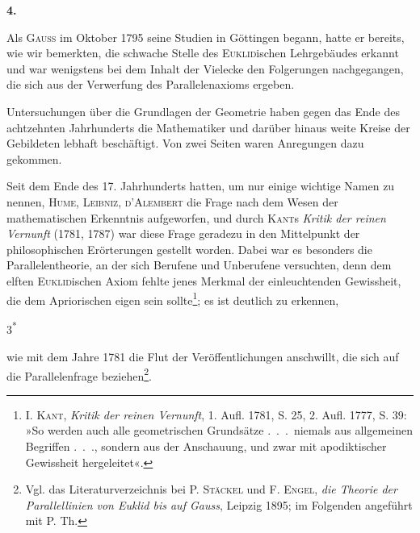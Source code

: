 \clearpage\begingroup{}
\renewcommand{\thefootnote}{\arabic{footnote})}\setcounter{footnote}{0}
\begin{center}\textbf{4.}\par\smallskip
{}
\end{center}
\noindent\hspace*{\parindent}Als \textsc{Gauss} im Oktober 1795 seine Studien in Göttingen begann, hatte
er bereits, wie wir bemerkten, die schwache Stelle des \textsc{Euklid}ischen Lehrgebäudes
erkannt und war wenigstens bei dem Inhalt der Vielecke den Folgerungen
nachgegangen, die sich aus der Verwerfung des Parallelenaxioms ergeben.
\par
Untersuchungen über die Grundlagen der Geometrie haben gegen das
Ende des achtzehnten Jahrhunderts die Mathematiker und darüber hinaus weite
Kreise der Gebildeten lebhaft beschäftigt. Von zwei Seiten waren Anregungen
dazu gekommen.
\par
Seit dem Ende des 17. Jahrhunderts hatten, um nur einige wichtige
Namen zu nennen, \textsc{Hume}, \textsc{Leibniz}, \textsc{d’Alembert} die Frage nach dem Wesen
der mathematischen Erkenntnis aufgeworfen, und durch \textsc{Kant}s \textit{Kritik der
reinen Vernunft} (1781, 1787) war diese Frage geradezu in den Mittelpunkt
der philosophischen Erörterungen gestellt worden. Dabei war es besonders
die Parallelentheorie, an der sich Berufene und Unberufene versuchten, denn
dem elften \textsc{Euklid}ischen Axiom fehlte jenes Merkmal der einleuchtenden Gewissheit,
die dem Apriorischen eigen sein sollte\footnote{I. \textsc{Kant}, \textit{Kritik der reinen Vernunft}, 1. Aufl. 1781, S. 25, 2. Aufl. 1777, S. 39: »So werden auch alle geometrischen Grundsätze .\ .\ .\ niemals aus allgemeinen Begriffen .\ .\ ., sondern aus der Anschauung, und zwar  mit apodiktischer Gewissheit hergeleitet«.}; es ist deutlich zu erkennen,
\par\vfill\hfill{\footnotesize 3\textsuperscript{*}}\par
\clearpage{}\setcounter{footnote}{0}
\noindent wie mit dem Jahre 1781 die Flut der Veröffentlichungen anschwillt, die sich
auf die Parallelenfrage beziehen\footnote{Vgl. das Literaturverzeichnis bei P. \textsc{Stäckel} und F. \textsc{Engel}, \textit{die Theorie der Parallellinien von Euklid bis auf Gauss}, Leipzig 1895; im Folgenden angeführt mit P. Th.}.
